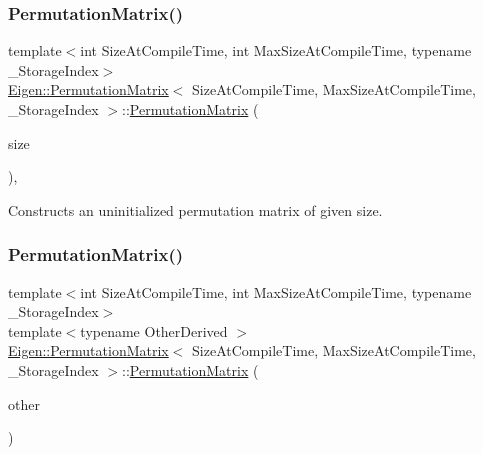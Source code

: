 \subsubsection{\texorpdfstring{PermutationMatrix()}{PermutationMatrix()}\hspace{0.1cm}{\footnotesize\ttfamily [1/5]}}
{\footnotesize\ttfamily template$<$int Size\+At\+Compile\+Time, int Max\+Size\+At\+Compile\+Time, typename \+\_\+\+Storage\+Index$>$ \\
\mbox{\hyperlink{class_eigen_1_1_permutation_matrix}{Eigen\+::\+Permutation\+Matrix}}$<$ Size\+At\+Compile\+Time, Max\+Size\+At\+Compile\+Time, \+\_\+\+Storage\+Index $>$\+::\mbox{\hyperlink{class_eigen_1_1_permutation_matrix}{Permutation\+Matrix}} (\begin{DoxyParamCaption}\item[{\mbox{\hyperlink{struct_eigen_1_1_eigen_base_a554f30542cc2316add4b1ea0a492ff02}{Index}}}]{size }\end{DoxyParamCaption})\hspace{0.3cm}{\ttfamily [inline]}, {\ttfamily [explicit]}}

Constructs an uninitialized permutation matrix of given size. \mbox{\label{class_eigen_1_1_permutation_matrix_a7ae7016a606b08573013115dcf2e56f2}} 
\subsubsection{\texorpdfstring{PermutationMatrix()}{PermutationMatrix()}\hspace{0.1cm}{\footnotesize\ttfamily [2/5]}}
{\footnotesize\ttfamily template$<$int Size\+At\+Compile\+Time, int Max\+Size\+At\+Compile\+Time, typename \+\_\+\+Storage\+Index$>$ \\
template$<$typename Other\+Derived $>$ \\
\mbox{\hyperlink{class_eigen_1_1_permutation_matrix}{Eigen\+::\+Permutation\+Matrix}}$<$ Size\+At\+Compile\+Time, Max\+Size\+At\+Compile\+Time, \+\_\+\+Storage\+Index $>$\+::\mbox{\hyperlink{class_eigen_1_1_permutation_matrix}{Permutation\+Matrix}} (\begin{DoxyParamCaption}\item[{const \mbox{\hyperlink{class_eigen_1_1_permutation_base}{Permutation\+Base}}$<$ Other\+Derived $>$ \&}]{other }\end{DoxyParamCaption})\hspace{0.3cm}{\ttfamily [inline]}}

